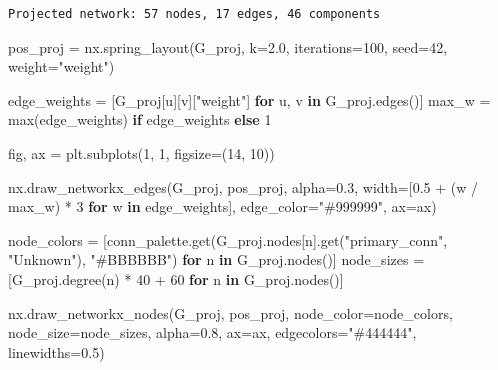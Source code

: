 \documentclass[
  letterpaper,
  DIV=11,
  numbers=noendperiod]{scrartcl}
\newenvironment{Shaded}{\begin{snugshade}}{\end{snugshade}}
\newcommand{\BuiltInTok}[1]{\textcolor[rgb]{0.00,0.23,0.31}{#1}}
\newcommand{\ControlFlowTok}[1]{\textcolor[rgb]{0.00,0.23,0.31}{\textbf{#1}}}
\newcommand{\DecValTok}[1]{\textcolor[rgb]{0.68,0.00,0.00}{#1}}
\newcommand{\FloatTok}[1]{\textcolor[rgb]{0.68,0.00,0.00}{#1}}
\newcommand{\KeywordTok}[1]{\textcolor[rgb]{0.00,0.23,0.31}{\textbf{#1}}}
\newcommand{\NormalTok}[1]{\textcolor[rgb]{0.00,0.23,0.31}{#1}}
\newcommand{\OperatorTok}[1]{\textcolor[rgb]{0.37,0.37,0.37}{#1}}
\newcommand{\StringTok}[1]{\textcolor[rgb]{0.13,0.47,0.30}{#1}}
\begin{document}
\begin{verbatim}
Projected network: 57 nodes, 17 edges, 46 components
\end{verbatim}

\begin{Shaded}
\begin{Highlighting}[]
\NormalTok{pos\_proj }\OperatorTok{=}\NormalTok{ nx.spring\_layout(G\_proj, k}\OperatorTok{=}\FloatTok{2.0}\NormalTok{, iterations}\OperatorTok{=}\DecValTok{100}\NormalTok{,}
\NormalTok{                            seed}\OperatorTok{=}\DecValTok{42}\NormalTok{, weight}\OperatorTok{=}\StringTok{"weight"}\NormalTok{)}

\NormalTok{edge\_weights }\OperatorTok{=}\NormalTok{ [G\_proj[u][v][}\StringTok{"weight"}\NormalTok{] }\ControlFlowTok{for}\NormalTok{ u, v }\KeywordTok{in}\NormalTok{ G\_proj.edges()]}
\NormalTok{max\_w }\OperatorTok{=} \BuiltInTok{max}\NormalTok{(edge\_weights) }\ControlFlowTok{if}\NormalTok{ edge\_weights }\ControlFlowTok{else} \DecValTok{1}

\NormalTok{fig, ax }\OperatorTok{=}\NormalTok{ plt.subplots(}\DecValTok{1}\NormalTok{, }\DecValTok{1}\NormalTok{, figsize}\OperatorTok{=}\NormalTok{(}\DecValTok{14}\NormalTok{, }\DecValTok{10}\NormalTok{))}

\NormalTok{nx.draw\_networkx\_edges(G\_proj, pos\_proj, alpha}\OperatorTok{=}\FloatTok{0.3}\NormalTok{,}
\NormalTok{                       width}\OperatorTok{=}\NormalTok{[}\FloatTok{0.5} \OperatorTok{+}\NormalTok{ (w }\OperatorTok{/}\NormalTok{ max\_w) }\OperatorTok{*} \DecValTok{3} \ControlFlowTok{for}\NormalTok{ w }\KeywordTok{in}\NormalTok{ edge\_weights],}
\NormalTok{                       edge\_color}\OperatorTok{=}\StringTok{"\#999999"}\NormalTok{, ax}\OperatorTok{=}\NormalTok{ax)}

\NormalTok{node\_colors }\OperatorTok{=}\NormalTok{ [conn\_palette.get(G\_proj.nodes[n].get(}\StringTok{"primary\_conn"}\NormalTok{,}
               \StringTok{"Unknown"}\NormalTok{), }\StringTok{"\#BBBBBB"}\NormalTok{) }\ControlFlowTok{for}\NormalTok{ n }\KeywordTok{in}\NormalTok{ G\_proj.nodes()]}
\NormalTok{node\_sizes }\OperatorTok{=}\NormalTok{ [G\_proj.degree(n) }\OperatorTok{*} \DecValTok{40} \OperatorTok{+} \DecValTok{60} \ControlFlowTok{for}\NormalTok{ n }\KeywordTok{in}\NormalTok{ G\_proj.nodes()]}

\NormalTok{nx.draw\_networkx\_nodes(G\_proj, pos\_proj, node\_color}\OperatorTok{=}\NormalTok{node\_colors,}
\NormalTok{                       node\_size}\OperatorTok{=}\NormalTok{node\_sizes, alpha}\OperatorTok{=}\FloatTok{0.8}\NormalTok{, ax}\OperatorTok{=}\NormalTok{ax,}
\NormalTok{                       edgecolors}\OperatorTok{=}\StringTok{"\#444444"}\NormalTok{, linewidths}\OperatorTok{=}\FloatTok{0.5}\NormalTok{)}


\end{Highlighting}
\end{Shaded}
\end{document}
